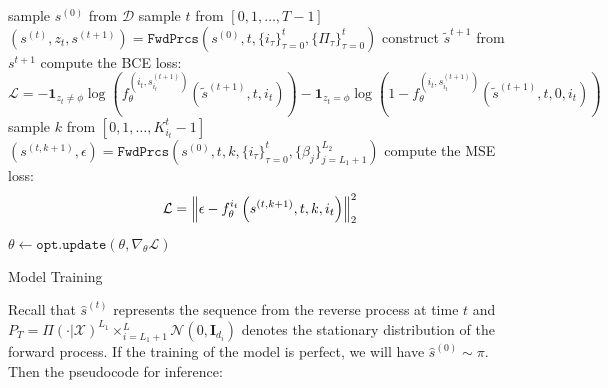 \begin{algorithm}[ht]
\begin{algorithmic}

 \STATE sample $s^{(0)}$ from $\mathcal{D}$
 \STATE sample $t$ from $[0, 1, \dots, T-1]$
    \STATE  $(s^{(t)}, z_{t}, s^{(t+1)}) = \texttt{FwdPrcs}(s^{(0)}, t, \{i_{\tau}\}_{\tau = 0}^t, \{\Pi_{\tau}\}_{\tau = 0}^t)$
    \STATE construct $\tilde{s}^{t+1}$ from ${s}^{t+1}$
    \STATE compute the BCE loss:
    $$ \mathcal{L} =  -  \mathbf{1}_{z_t \neq \phi}  \log \left( f_{\theta} ^{(i_t, s^{(t+1)}_{i_t})} \left(\tilde{s}^{(t+1)}, t, i_{t} \right) \right)
    - \mathbf{1}_{z_t = \phi}  \log \left(1 - f_{\theta} ^{(i_t, s^{(t+1)}_{i_t})} \left(\tilde{s}^{(t+1)}, t, 0, i_{t} \right) \right)  $$
 \ELSE
    \STATE  sample $k$ from $[0, 1, \dots, K_{i_t}^t - 1]$
    \STATE $(s^{(t, k+1)}, \epsilon) = \texttt{FwdPrcs}(s^{(0)}, t, k, \{i_{\tau}\}_{\tau = 0}^t, \{\beta_{j}\}_{j = L_1+1}^{L_2}) $
    \STATE compute the MSE loss:
    $$ \mathcal{L} = \norm{\epsilon - f^{i_t}_{\theta}\left({s}^{(t, k+1)}, t, k, i_t \right)}_2^2 $$
    
 \ENDIF
 \STATE $\theta \leftarrow \texttt{opt.update}(\theta, \nabla_{\theta}\mathcal{L})$
\ENDFOR
\end{algorithmic}
\caption{Model Training}
\label{app:alg:training}
\end{algorithm}

\newpage

Recall that $\hat{s}^{(t)}$ represents the sequence from the reverse process at time $t$ and $P_T = \Pi\left( \cdot| \mathcal{X} \right)^{L_1} \times_{i=L_1 + 1}^{L} \mathcal{N}\left(0, \mathbf{I}_{d_i} \right)$ denotes the stationary distribution of the forward process. If the training of the model is perfect, we will have $\hat{s}^{(0)} \sim \pi$. Then the pseudocode for inference:

